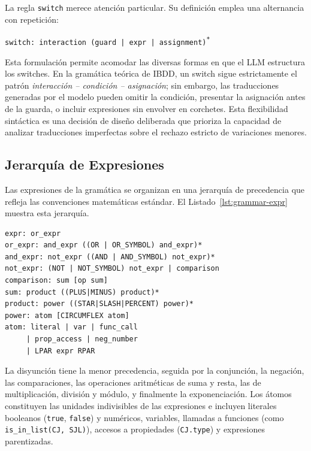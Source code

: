 La regla \texttt{switch} merece atención particular. Su definición emplea una alternancia con repetición:

\begin{center}
\texttt{switch: interaction (guard | expr | assignment)\textsuperscript{*}}
\end{center}

\noindent Esta formulación permite acomodar las diversas formas en que el LLM estructura los switches. En la gramática teórica de IBDD, un switch sigue estrictamente el patrón \textit{interacción -- condición -- asignación}; sin embargo, las traducciones generadas por el modelo pueden omitir la condición, presentar la asignación antes de la guarda, o incluir expresiones sin envolver en corchetes. Esta flexibilidad sintáctica es una decisión de diseño deliberada que prioriza la capacidad de analizar traducciones imperfectas sobre el rechazo estricto de variaciones menores.

\subsection{Jerarquía de Expresiones}

Las expresiones de la gramática se organizan en una jerarquía de precedencia que refleja las convenciones matemáticas estándar. El Listado~\ref{lst:grammar-expr} muestra esta jerarquía.
\begin{samepage}
\begin{center}
\begin{minipage}{0.95\textwidth}
\captionsetup{type=lstlisting}
\caption{Jerarquía de expresiones en la gramática IBDD}
\label{lst:grammar-expr}
\begin{lstlisting}
expr: or_expr
or_expr: and_expr ((OR | OR_SYMBOL) and_expr)*
and_expr: not_expr ((AND | AND_SYMBOL) not_expr)*
not_expr: (NOT | NOT_SYMBOL) not_expr | comparison
comparison: sum [op sum]
sum: product ((PLUS|MINUS) product)*
product: power ((STAR|SLASH|PERCENT) power)*
power: atom [CIRCUMFLEX atom]
atom: literal | var | func_call
     | prop_access | neg_number
     | LPAR expr RPAR
\end{lstlisting}
\end{minipage}
\end{center}
\end{samepage}

La disyunción tiene la menor precedencia, seguida por la conjunción, la negación, las comparaciones, las operaciones aritméticas de suma y resta, las de multiplicación, división y módulo, y finalmente la exponenciación. Los átomos constituyen las unidades indivisibles de las expresiones e incluyen literales booleanos (\texttt{true}, \texttt{false}) y numéricos, variables, llamadas a funciones (como \texttt{is\_in\_list(CJ, SJL)}), accesos a propiedades (\texttt{CJ.type}) y expresiones parentizadas.

